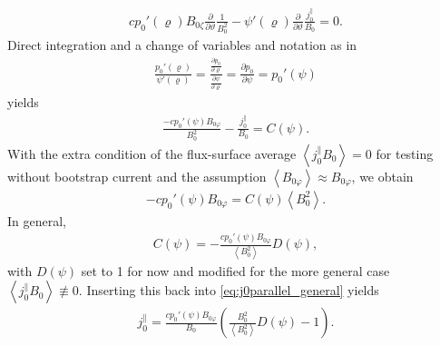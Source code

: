 \documentclass[a4paper, 10pt, english]{article}
\let\temp\varrho
\let\varrho\rho
\let\rho\temp
\let\temp\vartheta
\let\vartheta\theta
\let\theta\temp
\let\temp\varphi
\let\varphi\phi
\let\phi\temp
\newcommand*\pd[2][]{\ensuremath{\frac{\partial #1}{\partial #2}}}  %
\begin{document}
\begin{gather}
  c p_{0}' (\rho) B_{0 \zeta} \pd{\theta} \frac{1}{B_{0}^{2}} - \psi'(\rho) \pd{\theta} \frac{j_{0}^{\parallel}}{B_{0}} = 0.
\end{gather}
Direct integration and a change of variables and notation as in
\begin{gather}
  \frac{p_{0}'(\rho)}{\psi'(\rho)} = \frac{\pd[p_{0}]{\rho}}{\pd[\psi]{\rho}} = \pd[p_{0}]{\psi} = p_{0}'(\psi)
\end{gather}
yields
\begin{gather}
  \frac{-c p_{0}' (\psi) B_{0 \phi}}{B_{0}^{2}} - \frac{j_{0}^{\parallel}}{B_{0}} = C(\psi). \label{eq:j0parallel_general}
\end{gather}
With the extra condition of the flux-surface average $\left\langle j_{0}^{\parallel} B_{0} \right\rangle = 0$ for testing without bootstrap current and the assumption $\left\langle B_{0 \phi} \right\rangle \approx B_{0 \phi}$, we obtain
\begin{gather}
  -c p_{0}'(\psi) B_{0 \phi} = C(\psi) \left\langle B_{0}^{2} \right\rangle.
\end{gather}
In general, 
\begin{gather}
  C(\psi) = -\frac{c p_{0}'(\psi) B_{0 \phi}}{\left\langle B_{0}^{2} \right\rangle} D(\psi),
\end{gather}
with $D(\psi)$ set to 1 for now and modified for the more general case $\left\langle j_{0}^{\parallel} B_{0} \right\rangle \not\equiv 0$. Inserting this back into \cref{eq:j0parallel_general} yields
\begin{gather}
  j_{0}^{\parallel} = \frac{c p_{0}'(\psi) B_{0 \phi}}{B_{0}} \left( \frac{B_{0}^{2}}{\left\langle B_{0}^{2} \right\rangle} D(\psi) - 1 \right).
\end{gather}
\end{document}
